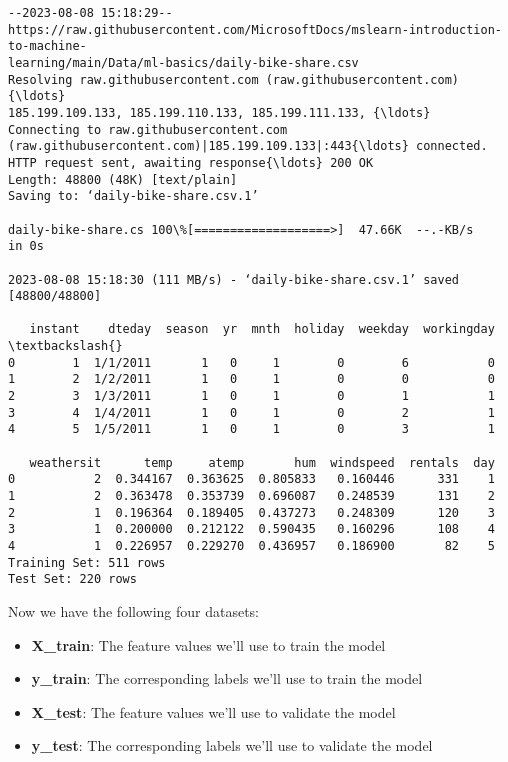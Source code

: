 \documentclass[11pt]{article}
\providecommand{\tightlist}{%
      \setlength{\itemsep}{0pt}\setlength{\parskip}{0pt}}
\begin{document}
    \begin{Verbatim}[commandchars=\\\{\}]
--2023-08-08 15:18:29--
https://raw.githubusercontent.com/MicrosoftDocs/mslearn-introduction-to-machine-
learning/main/Data/ml-basics/daily-bike-share.csv
Resolving raw.githubusercontent.com (raw.githubusercontent.com){\ldots}
185.199.109.133, 185.199.110.133, 185.199.111.133, {\ldots}
Connecting to raw.githubusercontent.com
(raw.githubusercontent.com)|185.199.109.133|:443{\ldots} connected.
HTTP request sent, awaiting response{\ldots} 200 OK
Length: 48800 (48K) [text/plain]
Saving to: ‘daily-bike-share.csv.1’

daily-bike-share.cs 100\%[===================>]  47.66K  --.-KB/s    in 0s

2023-08-08 15:18:30 (111 MB/s) - ‘daily-bike-share.csv.1’ saved [48800/48800]

   instant    dteday  season  yr  mnth  holiday  weekday  workingday  \textbackslash{}
0        1  1/1/2011       1   0     1        0        6           0
1        2  1/2/2011       1   0     1        0        0           0
2        3  1/3/2011       1   0     1        0        1           1
3        4  1/4/2011       1   0     1        0        2           1
4        5  1/5/2011       1   0     1        0        3           1

   weathersit      temp     atemp       hum  windspeed  rentals  day
0           2  0.344167  0.363625  0.805833   0.160446      331    1
1           2  0.363478  0.353739  0.696087   0.248539      131    2
2           1  0.196364  0.189405  0.437273   0.248309      120    3
3           1  0.200000  0.212122  0.590435   0.160296      108    4
4           1  0.226957  0.229270  0.436957   0.186900       82    5
Training Set: 511 rows
Test Set: 220 rows
    \end{Verbatim}

    Now we have the following four datasets:

\begin{itemize}
\tightlist
\item
  \textbf{X\_train}: The feature values we'll use to train the model
\item
  \textbf{y\_train}: The corresponding labels we'll use to train the
  model
\item
  \textbf{X\_test}: The feature values we'll use to validate the model
\item
  \textbf{y\_test}: The corresponding labels we'll use to validate the
  model
\end{itemize}
\end{document}
